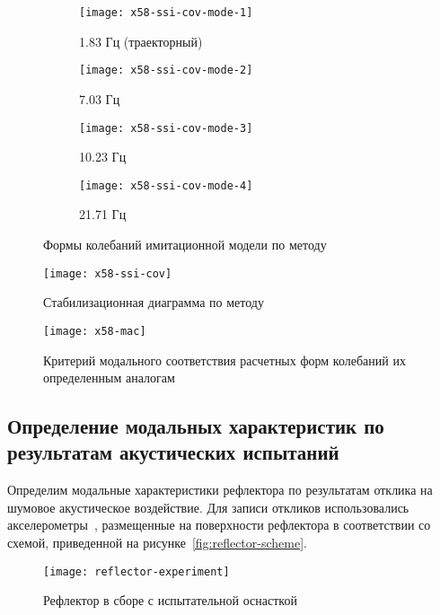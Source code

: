 \def\sfX58{0.44\textwidth}

\begin{figure}[!htb]
	\centering
	\begin{subfigure}[b]{\sfX58}
		\texttt{[image: x58-ssi-cov-mode-1]}
		\caption{1.83 Гц (траекторный)} \label{subfig:x58-ssi-cov-mode-1}
	\end{subfigure}
	\hfill
	\begin{subfigure}[b]{\sfX58}
		\texttt{[image: x58-ssi-cov-mode-2]}
		\caption{7.03 Гц}
	\end{subfigure}
	\begin{subfigure}[b]{\sfX58}
		\texttt{[image: x58-ssi-cov-mode-3]}
		\caption{10.23 Гц}
	\end{subfigure}	
	\hfill
	\begin{subfigure}[b]{\sfX58}
		\texttt{[image: x58-ssi-cov-mode-4]}
		\caption{21.71 Гц} \label{subfig:x58-ssi-cov-mode-4}
	\end{subfigure}	
	\caption{Формы колебаний имитационной модели по методу }
\end{figure}

\begin{figure}[H]
	\centerfloat
	\texttt{[image: x58-ssi-cov]}
	\caption{Стабилизационная диаграмма по методу } \label{fig:x58-ssi-cov}
\end{figure}

\begin{figure}[!htb]
	\centerfloat
	\texttt{[image: x58-mac]}
	\caption{Критерий модального соответствия расчетных форм колебаний их определенным аналогам} \label{fig:x58-mac}
\end{figure}

\subsection{Определение модальных характеристик по результатам акустических испытаний}

Определим модальные характеристики рефлектора  по результатам отклика на шумовое акустическое воздействие. Для записи откликов использовались акселерометры~, размещенные на поверхности рефлектора в соответствии со схемой, приведенной на рисунке~\ref{fig:reflector-scheme}.

\begin{figure}[!htb]
	\centerfloat
	\texttt{[image: reflector-experiment]}
	\caption{Рефлектор в сборе с испытательной оснасткой} \label{fig:reflector-experiment}
\end{figure}

